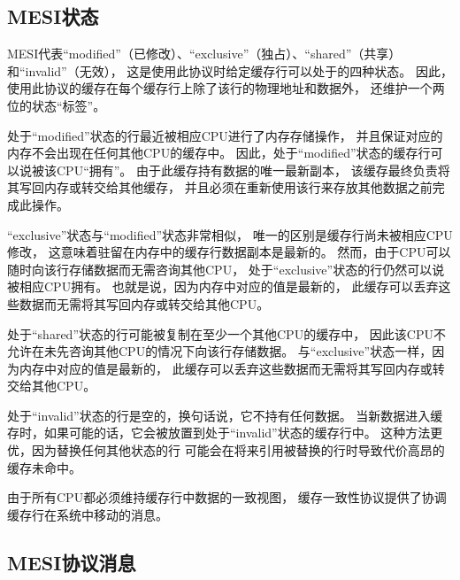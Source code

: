 \subsection{MESI状态}
\label{sec:app:whymb:MESI States}

MESI代表``modified''（已修改）、``exclusive''（独占）、``shared''（共享）
和``invalid''（无效），
这是使用此协议时给定缓存行可以处于的四种状态。
因此，使用此协议的缓存在每个缓存行上除了该行的物理地址和数据外，
还维护一个两位的状态``标签''。

处于``modified''状态的行最近被相应CPU进行了内存存储操作，
并且保证对应的内存不会出现在任何其他CPU的缓存中。
因此，处于``modified''状态的缓存行可以说被该CPU``拥有''。\@
由于此缓存持有数据的唯一最新副本，
该缓存最终负责将其写回内存或转交给其他缓存，
并且必须在重新使用该行来存放其他数据之前完成此操作。

``exclusive''状态与``modified''状态非常相似，
唯一的区别是缓存行尚未被相应CPU修改，
这意味着驻留在内存中的缓存行数据副本是最新的。
然而，由于CPU可以随时向该行存储数据而无需咨询其他CPU，
处于``exclusive''状态的行仍然可以说被相应CPU拥有\@。
也就是说，因为内存中对应的值是最新的，
此缓存可以丢弃这些数据而无需将其写回内存或转交给其他CPU\@。

处于``shared''状态的行可能被复制在至少一个其他CPU的缓存中，
因此该CPU不允许在未先咨询其他CPU的情况下向该行存储数据。
与``exclusive''状态一样，因为内存中对应的值是最新的，
此缓存可以丢弃这些数据而无需将其写回内存或转交给其他CPU\@。

处于``invalid''状态的行是空的，换句话说，它不持有任何数据。
当新数据进入缓存时，如果可能的话，它会被放置到处于``invalid''状态的缓存行中。
这种方法更优，因为替换任何其他状态的行
可能会在将来引用被替换的行时导致代价高昂的缓存未命中。

由于所有CPU都必须维持缓存行中数据的一致视图，
缓存一致性协议提供了协调缓存行在系统中移动的消息。

\subsection{MESI协议消息}
\label{sec:app:whymb:MESI Protocol Messages}

